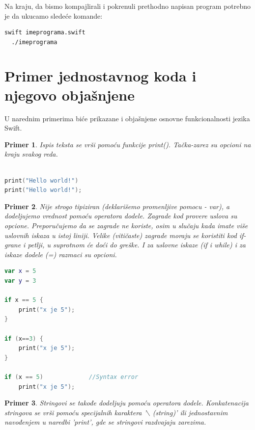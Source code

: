 \documentclass[a4paper]{article}
\newtheorem{primer}{Primer}[section]
\begin{document}
Na kraju, da bismo kompajlirali i pokrenuli prethodno napisan program potrebno je da ukucamo sledeće komande:

\begin{lstlisting}[language=bash]
  swift imeprograma.swift
  ./imeprograma
\end{lstlisting}


\section{Primer jednostavnog koda i njegovo objašnjene}	
\label{sec:sestiDeo}

U narednim primerima biće prikazane i objašnjene osnovne funkcionalnosti jezika Swift.
\begin{primer}

Ispis teksta se vrši pomoću funkcije print(). Tačka-zarez su opcioni na kraju svakog reda.
\end{primer}

\begin{lstlisting}[language=Swift, caption={Ispis teksta},frame=single, label=simple]

print("Hello world!")
print("Hello world!");

\end{lstlisting}

\begin{primer}
Nije strogo tipiziran (deklarišemo promenljive pomocu - var), a dodeljujemo vrednost pomoću operatora dodele. Zagrade kod provere uslova su opcione. Preporučujemo da se zagrade ne koriste, osim u slučaju kada imate više uslovnih iskaza u istoj liniji.
Velike (vitičaste) zagrade moraju se koristiti kod if-grane i petlji, u suprotnom će doći do greške. I za uslovne iskaze (if i while) i za iskaze dodele (=) razmaci su opcioni.
\end{primer}
\begin{lstlisting}[language=Swift, caption={Dodeljivanje vrednosti i provera uslova},frame=single, label=simple]
var x = 5
var y = 3

if x == 5 {
	print("x je 5");
}

if (x==3) {
	print("x je 5");
}

if (x == 5)				//Syntax error
	print("x je 5");
\end{lstlisting}

\begin{primer}
Stringovi se takođe dodeljuju pomoću operatora dodele. Konkatenacija stringova se vrši pomoću specijalnih karaktera '$\backslash$ (string)' ili jednostavnim navođenjem u naredbi 'print', gde se stringovi razdvajaju zarezima.
\end{primer}
\end{document}
